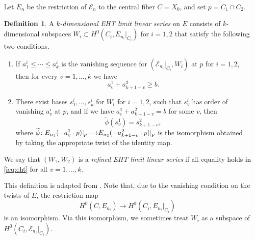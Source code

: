 \documentclass[11pt,reqno]{amsart}
\theoremstyle{plain}
\theoremstyle{definition}
\newtheorem{definition}[theorem]{Definition}
\theoremstyle{remark}
\numberwithin{equation}{section}
\renewcommand{\to}{{\longrightarrow}}
\numberwithin{equation}{section}
\begin{document}
Let $E_n$ be the restriction of $\mathcal E_n$ to the central fiber $C = X_0$, and set $p = C_1 \cap C_2$.
\begin{definition}
  \label{def:eht}
  A \emph{$k$-dimensional EHT limit linear series} on $E$ consists of $k$-dimensional subspaces $W_i \subset H^0(C_i, E_{n_i}|_{C_i})$ for $i = 1, 2$ that satisfy the following two conditions.
  \begin{enumerate}
  \item
    \label{ieq:eht}
    If $a^i_1 \leq \cdots \leq a^i_k$ is the vanishing sequence for $(\mathcal E_{n_i}|_{C_i}, W_i)$ at $p$ for $i = 1, 2$, then for every $v = 1, \dots, k$ we have
    \[ a^1_v + a^2_{k+1-v} \geq b.\]
  \item\label{gluing:eht}
    There exist bases $s^i_1, \dots, s^i_k$ for $W_i$ for $i = 1, 2$, such that $s^i_v$ has order of vanishing $a^i_v$ at $p$, and if we have $a^1_v + a^2_{k+1-v} = b$ for some $v$, then
    \[ \widetilde \phi (s^1_v) = s^2_{k+1-v},\]
    where $\widetilde \phi \from E_{n_1}(-a^1_{v}\cdot p)|_p \to E_{n_2}(-a^2_{k+1-v} \cdot p) |_p$ is the isomorphism obtained by taking the appropriate twist of the identity map.
  \end{enumerate}
  We say that $(W_1, W_2)$ is a \emph{refined EHT limit linear series} if all equality holds in \eqref{ieq:eht} for all $v = 1, \dots, k$.
\end{definition}
This definition is adapted from \cite[Definition~4.1.2]{oss:14}.
Note that, due to the vanishing condition on the twists of $E$, the restriction map
\[ H^0(C, E_{n_i}) \to H^0(C_i, E_{n_i}|_{C_i})\]
is an isomorphism.
Via this isomorphism, we sometimes treat $W_i$ as a subspace of $H^0(C_i, \mathcal E_{n_i}|_{C_i})$.
\end{document}
